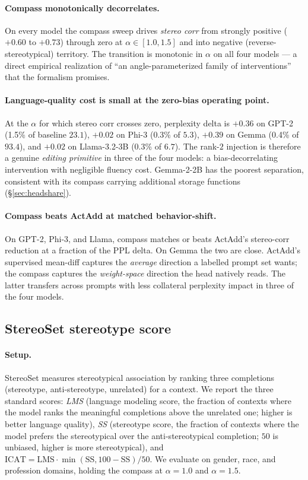 \paragraph{Compass monotonically decorrelates.} On every model
the compass sweep drives \emph{stereo corr} from strongly positive
($+0.60$ to $+0.73$) through zero at $\alpha \in [1.0, 1.5]$ and into
negative (reverse-stereotypical) territory. The transition is
monotonic in $\alpha$ on all four models --- a direct empirical
realization of ``an angle-parameterized family of interventions'' that
the formalism promises.

\paragraph{Language-quality cost is small at the zero-bias operating
point.} At the $\alpha$ for which stereo corr crosses zero, perplexity
delta is $+0.36$ on GPT-2 (1.5\% of baseline $23.1$), $+0.02$ on Phi-3
(0.3\% of $5.3$), $+0.39$ on Gemma (0.4\% of $93.4$), and $+0.02$ on
Llama-3.2-3B (0.3\% of $6.7$). The rank-$2$ injection is therefore a
genuine \emph{editing primitive} in three of the four models: a
bias-decorrelating intervention with negligible fluency cost.
Gemma-2-2B has the poorest separation, consistent with its
compass carrying additional storage functions (\S\ref{sec:headshare}).

\paragraph{Compass beats ActAdd at matched behavior-shift.} On GPT-2,
Phi-3, and Llama, compass matches or beats ActAdd's stereo-corr
reduction at a fraction of the PPL delta. On Gemma the two are
close. ActAdd's supervised mean-diff captures the \emph{average}
direction a labelled prompt set wants; the compass captures the
\emph{weight-space} direction the head natively reads. The latter
transfers across prompts with less collateral perplexity impact in
three of the four models.

\subsection{StereoSet stereotype score}
\label{sec:stereoset}

\paragraph{Setup.} StereoSet \citep{nadeem2021stereoset} measures
stereotypical association by ranking three completions (stereotype,
anti-stereotype, unrelated) for a context. We report the three
standard scores: \emph{LMS} (language modeling score, the fraction of
contexts where the model ranks the meaningful completions above the
unrelated one; higher is better language quality), \emph{SS}
(stereotype score, the fraction of contexts where the model prefers
the stereotypical over the anti-stereotypical completion; $50$ is
unbiased, higher is more stereotypical), and
$\mathrm{ICAT} = \mathrm{LMS} \cdot \min(\mathrm{SS}, 100-\mathrm{SS})/50$.
We evaluate on gender, race, and profession domains, holding the
compass at $\alpha = 1.0$ and $\alpha = 1.5$.

